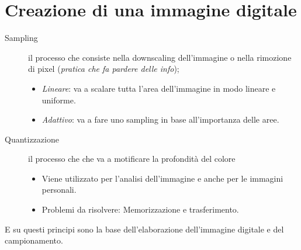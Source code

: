 \documentclass{report}
\begin{document}
\section{Creazione di una immagine digitale}
\label{sec:creadiunimgdig}

\begin{description}
\item[Sampling] il processo che consiste nella downscaling dell'immagine
  o nella rimozione di pixel (\textit{pratica che fa pardere
    delle info});
  \begin{itemize}
  \item \textit{Lineare}: va a scalare tutta l'area dell'immagine in
    modo lineare e uniforme.
  \item \textit{Adattivo}: va a fare uno sampling in base all'importanza
    delle aree.
  \end{itemize}
\item[Quantizzazione] il processo che che va a motificare la profondità
  del colore
  \begin{itemize}
  \item Viene utilizzato per l'analisi dell'immagine e anche per le
    immagini personali.
  \item Problemi da risolvere: Memorizzazione e trasferimento.
  \end{itemize}
\end{description}
E su questi principi sono la base dell'elaborazione dell'immagine
digitale e del campionamento.
\end{document}
